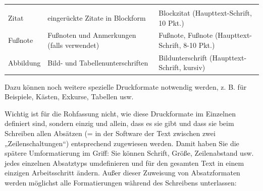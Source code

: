 \documentclass[]{book}
\theoremstyle{definition}
\theoremstyle{definition}
\theoremstyle{definition}
\theoremstyle{remark}
\begin{document}
\begin{longtable}[]{@{}lll@{}}
\begin{minipage}[t]{0.38\columnwidth}
\end{minipage}\tabularnewline
\begin{minipage}[t]{0.11\columnwidth}\raggedright\strut
Zitat\strut
\end{minipage} & \begin{minipage}[t]{0.41\columnwidth}\raggedright\strut
eingerückte Zitate in Blockform\strut
\end{minipage} & \begin{minipage}[t]{0.38\columnwidth}\raggedright\strut
Blockzitat (Haupttext-Schrift, 10 Pkt.) \vspace{-6mm}\strut
\end{minipage}\tabularnewline
\begin{minipage}[t]{0.11\columnwidth}\raggedright\strut
Fußnote\strut
\end{minipage} & \begin{minipage}[t]{0.41\columnwidth}\raggedright\strut
Fußnoten und Anmerkungen (falls verwendet)\strut
\end{minipage} & \begin{minipage}[t]{0.38\columnwidth}\raggedright\strut
Fußnote, Fußnote (Haupttext-Schrift, 8-10 Pkt.) \vspace{-6mm}\strut
\end{minipage}\tabularnewline
\begin{minipage}[t]{0.11\columnwidth}\raggedright\strut
Abbildung\strut
\end{minipage} & \begin{minipage}[t]{0.41\columnwidth}\raggedright\strut
Bild- und Tabellenunterschriften\strut
\end{minipage} & \begin{minipage}[t]{0.38\columnwidth}\raggedright\strut
Bildunterschrift (Haupttext-Schrift, kursiv)\strut
\end{minipage}\tabularnewline
\bottomrule
\end{longtable}

Dazu können noch weitere spezielle Druckformate notwendig werden, z. B.
für Beispiele, Kästen, Exkurse, Tabellen usw.

Wichtig ist für die Rohfassung nicht, wie diese Druckformate im
Einzelnen definiert sind, sondern einzig und allein, dass es sie gibt
und dass sie beim Schreiben allen Absätzen (= in der Software der Text
zwischen zwei „Zeilenschaltungen``) entsprechend zugewiesen werden.
Damit haben Sie die spätere Umformatierung im Griff: Sie können Schrift,
Größe, Zeilenabstand usw. jedes einzelnen Absatztyps umdefinieren und
für den gesamten Text in einem einzigen Arbeitsschritt ändern. Außer
dieser Zuweisung von Absatzformaten werden möglichst alle Formatierungen
während des Schreibens unterlassen:
\end{document}

